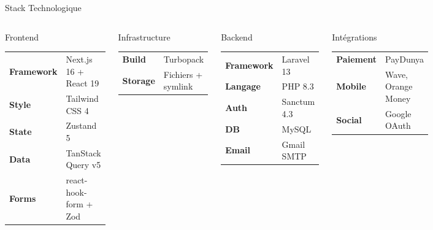﻿\documentclass[aspectratio=169,10pt]{beamer}
\begin{document}
\begin{frame}{Stack Technologique}
\begin{columns}[T]
\begin{block}{Frontend}
\begin{tabular}{ll}
\textbf{Framework} & Next.js 16 + React 19 \\
\textbf{Style}     & Tailwind CSS 4 \\
\textbf{State}     & Zustand 5 \\
\textbf{Data}      & TanStack Query v5 \\
\textbf{Forms}     & react-hook-form + Zod \\
\end{tabular}
\end{block}
\vspace{0.3cm}
\begin{block}{Infrastructure}
\begin{tabular}{ll}
\textbf{Build}   & Turbopack \\
\textbf{Storage} & Fichiers + symlink \\
\end{tabular}
\end{block}
\begin{block}{Backend}
\begin{tabular}{ll}
\textbf{Framework} & Laravel 13 \\
\textbf{Langage}   & PHP 8.3 \\
\textbf{Auth}      & Sanctum 4.3 \\
\textbf{DB}        & MySQL \\
\textbf{Email}     & Gmail SMTP \\
\end{tabular}
\end{block}
\vspace{0.3cm}
\begin{alertblock}{Int\'{e}grations}
\begin{tabular}{ll}
\textbf{Paiement} & PayDunya \\
\textbf{Mobile}   & Wave, Orange Money \\
\textbf{Social}   & Google OAuth \\
\end{tabular}
\end{alertblock}
\end{columns}
\end{frame}
\end{document}
